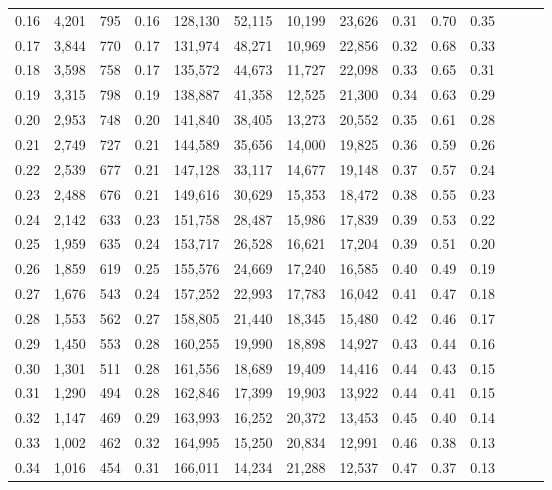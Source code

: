 \begin{tabular}{rrrrrrrrrrrrrr}
0.16 &   4,201 &  795 &  0.16 &  128,130 &   52,115 &  10,199 &  23,626 &  0.31 &  0.70 &      0.35 \\
0.17 &   3,844 &  770 &  0.17 &  131,974 &   48,271 &  10,969 &  22,856 &  0.32 &  0.68 &      0.33 \\
0.18 &   3,598 &  758 &  0.17 &  135,572 &   44,673 &  11,727 &  22,098 &  0.33 &  0.65 &      0.31 \\
0.19 &   3,315 &  798 &  0.19 &  138,887 &   41,358 &  12,525 &  21,300 &  0.34 &  0.63 &      0.29 \\
0.20 &   2,953 &  748 &  0.20 &  141,840 &   38,405 &  13,273 &  20,552 &  0.35 &  0.61 &      0.28 \\
0.21 &   2,749 &  727 &  0.21 &  144,589 &   35,656 &  14,000 &  19,825 &  0.36 &  0.59 &      0.26 \\
0.22 &   2,539 &  677 &  0.21 &  147,128 &   33,117 &  14,677 &  19,148 &  0.37 &  0.57 &      0.24 \\
0.23 &   2,488 &  676 &  0.21 &  149,616 &   30,629 &  15,353 &  18,472 &  0.38 &  0.55 &      0.23 \\
0.24 &   2,142 &  633 &  0.23 &  151,758 &   28,487 &  15,986 &  17,839 &  0.39 &  0.53 &      0.22 \\
0.25 &   1,959 &  635 &  0.24 &  153,717 &   26,528 &  16,621 &  17,204 &  0.39 &  0.51 &      0.20 \\
0.26 &   1,859 &  619 &  0.25 &  155,576 &   24,669 &  17,240 &  16,585 &  0.40 &  0.49 &      0.19 \\
0.27 &   1,676 &  543 &  0.24 &  157,252 &   22,993 &  17,783 &  16,042 &  0.41 &  0.47 &      0.18 \\
0.28 &   1,553 &  562 &  0.27 &  158,805 &   21,440 &  18,345 &  15,480 &  0.42 &  0.46 &      0.17 \\
0.29 &   1,450 &  553 &  0.28 &  160,255 &   19,990 &  18,898 &  14,927 &  0.43 &  0.44 &      0.16 \\
0.30 &   1,301 &  511 &  0.28 &  161,556 &   18,689 &  19,409 &  14,416 &  0.44 &  0.43 &      0.15 \\
0.31 &   1,290 &  494 &  0.28 &  162,846 &   17,399 &  19,903 &  13,922 &  0.44 &  0.41 &      0.15 \\
0.32 &   1,147 &  469 &  0.29 &  163,993 &   16,252 &  20,372 &  13,453 &  0.45 &  0.40 &      0.14 \\
0.33 &   1,002 &  462 &  0.32 &  164,995 &   15,250 &  20,834 &  12,991 &  0.46 &  0.38 &      0.13 \\
0.34 &   1,016 &  454 &  0.31 &  166,011 &   14,234 &  21,288 &  12,537 &  0.47 &  0.37 &      0.13 \\

\end{tabular}
